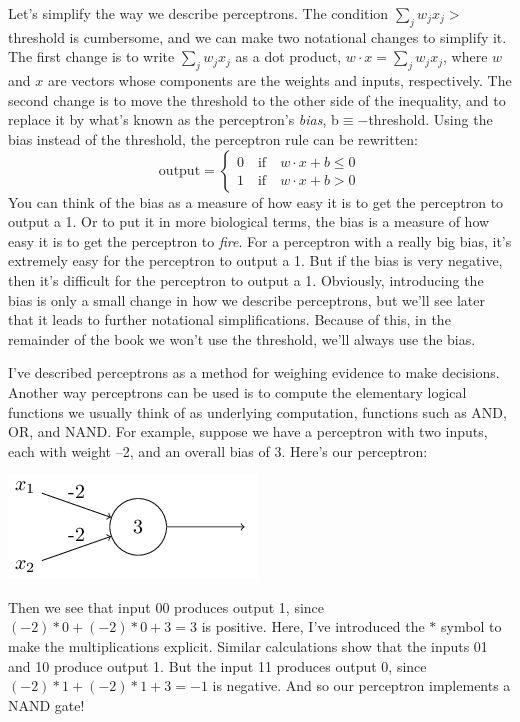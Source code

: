 \documentclass[a4paper,twoside,10pt]{book}
\begin{document}
Let's simplify the way we describe perceptrons. The condition $\sum_j w_jx_j>$threshold is cumbersome, and we can make two notational changes to simplify it. The first change is to write $\sum_j w_jx_j$ as a dot product, $w\cdot x = \sum_j w_jx_j$, where $w$ and $x$ are vectors whose components are the weights and inputs, respectively. The second change is to move the threshold to the other side of the inequality, and to replace it by what's known as the perceptron's \textit{bias}, b$\equiv-$threshold. Using the bias instead of the threshold, the perceptron rule can be rewritten:
\begin{equation}
\textrm{output} = \begin{cases}
0 \quad \textrm{if}\quad w\cdot x + b  \le 0 \\
1 \quad \textrm{if}\quad w\cdot x + b  > 0
\end{cases}
\end{equation}
You can think of the bias as a measure of how easy it is to get the perceptron to output a 1. Or to put it in more biological terms, the bias is a measure of how easy it is to get the perceptron to \textit{fire}. For a perceptron with a really big bias, it's extremely easy for the perceptron to output a 1. But if the bias is very negative, then it's difficult for the perceptron to output a 1. Obviously, introducing the bias is only a small change in how we describe perceptrons, but we'll see later that it leads to further notational simplifications. Because of this, in the remainder of the book we won't use the threshold, we'll always use the bias.

I've described perceptrons as a method for weighing evidence to make decisions. Another way perceptrons can be used is to compute the elementary logical functions we usually think of as underlying computation, functions such as AND, OR, and NAND. For example, suppose we have a perceptron with two inputs, each with weight --2, and an overall bias of 3. Here's our perceptron:
\begin{center}
	\includegraphics[scale=0.5]{./figures/ch1/tikz2}
\end{center}
Then we see that input 00 produces output 1, since $(-2)\ast0+(-2)\ast0+3=3$ is positive. Here, I've introduced the $\ast$ symbol to make the multiplications explicit. Similar calculations show that the inputs 01 and 10 produce output 1. But the input 11 produces output 0, since $(-2)\ast1+(-2)\ast1+3=-1$ is negative. And so our perceptron implements a NAND gate!
\end{document}
